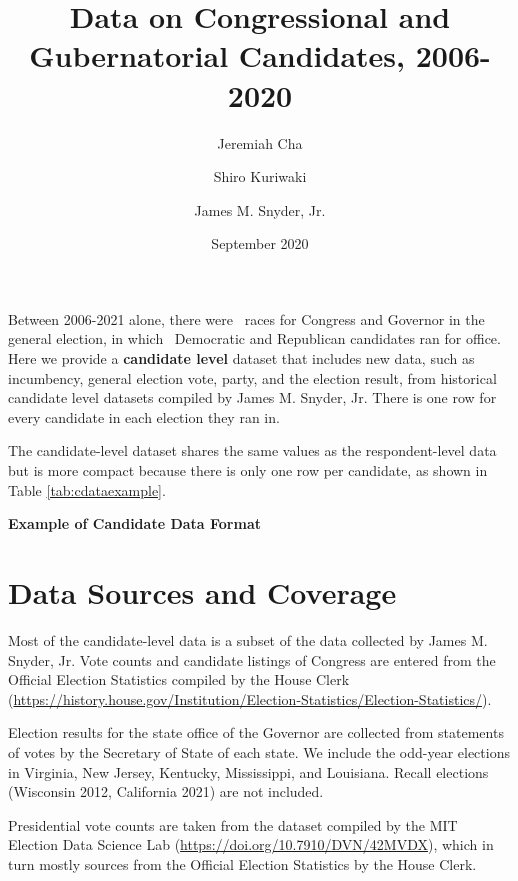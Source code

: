 \documentclass[12pt]{article}
\title{\large\textbf{Data on Congressional and Gubernatorial Candidates, 2006-2020}}
\author[1]{\normalsize Jeremiah Cha}
\author[2]{\normalsize Shiro Kuriwaki}
\author[1]{\normalsize James M. Snyder, Jr.}
\affil[1]{\footnotesize Department of Government, Harvard University.}
\affil[2]{\footnotesize To be Department of Political Science, Yale University}
\date{\normalsize September 2020}
\begin{document}
\maketitle 

Between 2006-2021 alone, there were \unskip \ races for Congress and Governor in the general election, in which \unskip \ Democratic and Republican candidates ran for office.  Here we provide a \textbf{candidate level} dataset that includes new data, such as incumbency, general election vote, party, and the election result, from historical candidate level datasets compiled by James M. Snyder, Jr. There is one row for every candidate in each election they ran in. 



The candidate-level dataset shares the same values as the respondent-level data but is more compact because there is only one row per candidate, as shown in Table \ref{tab:cdataexample}.

\begin{table}[!h]
\caption{\textbf{Example of Candidate Data Format} \label{tab:cdataexample}}
\centering
\footnotesize

\end{table}

\section{Data Sources and Coverage}

Most of the candidate-level data is a subset of the data collected by James M. Snyder, Jr. Vote counts and candidate listings of Congress are entered from the Official Election Statistics compiled by the House Clerk (\url{https://history.house.gov/Institution/Election-Statistics/Election-Statistics/}).  

Election results for the state office of the Governor are collected from statements of votes by the Secretary of State of each state. We include the odd-year elections in Virginia, New Jersey, Kentucky, Mississippi, and Louisiana. 
Recall elections (Wisconsin 2012, California 2021) are not included.

Presidential vote counts are taken from the dataset compiled by the MIT Election Data Science Lab (\url{https://doi.org/10.7910/DVN/42MVDX}), which in turn mostly sources from the Official Election Statistics by the House Clerk. 
\end{document}
